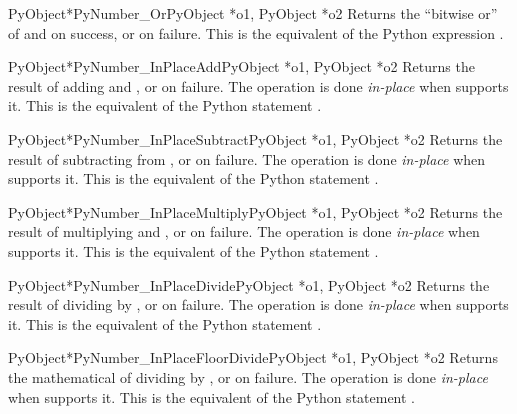 \begin{cfuncdesc}{PyObject*}{PyNumber_Or}{PyObject *o1, PyObject *o2}
  Returns the ``bitwise or'' of  and  on success, or
  \NULL{} on failure.  This is the equivalent of the Python expression
  .
\end{cfuncdesc}


\begin{cfuncdesc}{PyObject*}{PyNumber_InPlaceAdd}{PyObject *o1, PyObject *o2}
  Returns the result of adding  and , or \NULL{} on
  failure.  The operation is done \emph{in-place} when 
  supports it.  This is the equivalent of the Python statement
  .
\end{cfuncdesc}


\begin{cfuncdesc}{PyObject*}{PyNumber_InPlaceSubtract}{PyObject *o1,
                                                       PyObject *o2}
  Returns the result of subtracting  from , or \NULL{}
  on failure.  The operation is done \emph{in-place} when 
  supports it.  This is the equivalent of the Python statement
  .
\end{cfuncdesc}


\begin{cfuncdesc}{PyObject*}{PyNumber_InPlaceMultiply}{PyObject *o1,
                                                       PyObject *o2}
  Returns the result of multiplying  and , or \NULL{}
  on failure.  The operation is done \emph{in-place} when 
  supports it.  This is the equivalent of the Python statement
  .
\end{cfuncdesc}


\begin{cfuncdesc}{PyObject*}{PyNumber_InPlaceDivide}{PyObject *o1,
                                                     PyObject *o2}
  Returns the result of dividing  by , or \NULL{} on
  failure.  The operation is done \emph{in-place} when 
  supports it. This is the equivalent of the Python statement
  .
\end{cfuncdesc}


\begin{cfuncdesc}{PyObject*}{PyNumber_InPlaceFloorDivide}{PyObject *o1,
                                                          PyObject *o2}
  Returns the mathematical of dividing  by , or
  \NULL{} on failure.  The operation is done \emph{in-place} when
   supports it.  This is the equivalent of the Python
  statement .
\end{cfuncdesc}


